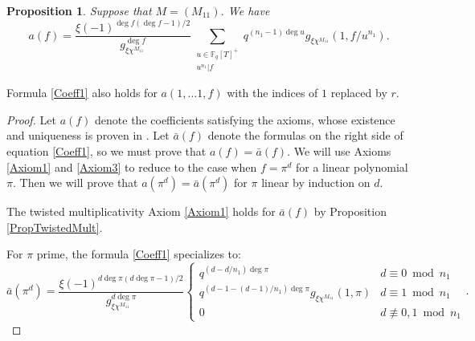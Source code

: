 \documentclass[11pt,letterpaper]{article}
\newtheorem{prop}[theorem]{Proposition}
\theoremstyle{definition}
\theoremstyle{remark}
\numberwithin{equation}{section}
\theoremstyle{dotless}
\newcommand{\F}{\mathbb{F}}
\begin{document}
\begin{prop}\label{PropCoeff1}
Suppose that $M=(M_{11})$. We have 
\begin{equation}\label{Coeff1}
a(f) = \frac{\xi(-1)^{\deg f(\deg f -1)/2}}{g_{\xi \chi^{M_{11}}}^{\deg f}} \sum_{\substack{u \in \F_q[T]^+ \\ u^{n_1}|f}} q^{(n_1-1)\deg u} g_{\xi \chi^{M_{11}}}(1, f/u^{n_1}).
\end{equation}
\end{prop}
Formula \eqref{Coeff1} also holds for $a(1, \ldots 1, f)$ with the indices of $1$ replaced by $r$. 
\begin{proof}
Let $a(f)$ denote the coefficients satisfying the axioms, whose existence and uniqueness is proven in \cite[Theorem 1.1]{s-amds}. Let $\bar{a}(f)$ denote the formulas on the right side of equation \eqref{Coeff1}, so we must prove that $a(f)=\bar{a}(f)$. We will use Axioms \ref{Axiom1} and \ref{Axiom3} to reduce to the case when $f=\pi^d$ for a linear polynomial $\pi$. Then we will prove that $a(\pi^d)=\bar{a}(\pi^d)$ for $\pi$ linear by induction on $d$.

The twisted multiplicativity Axiom \ref{Axiom1} holds for $\bar{a}(f)$ by Proposition \ref{PropTwistedMult}.

For $\pi$ prime, the formula \eqref{Coeff1} specializes to:
\begin{equation}\label{Coeff1Prime}
\bar{a}(\pi^d) = \frac{\xi(-1)^{d \deg \pi(d \deg \pi -1)/2}}{g_{\xi \chi^{M_{11}}}^{d \deg \pi}} \left\lbrace \begin{array}{cc} q^{(d-d/n_1)\deg \pi} & d \equiv 0 \bmod n_1 \\ q^{(d-1-(d-1)/n_1) \deg \pi}g_{\xi \chi^{M_{11}}}(1, \pi) & d \equiv 1 \bmod n_1 \\ 0 & d \not\equiv 0, 1 \bmod n_1 \end{array} \right. .
\end{equation}


\end{proof}
\end{document}
